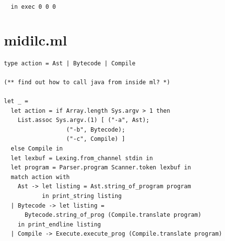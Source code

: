 \documentclass[12pt,A4]{book}
\begin{document}
\begin{verbatim}
  in exec 0 0 0
\end{verbatim}
\section{midilc.ml}
\begin{verbatim}
type action = Ast | Bytecode | Compile

(** find out how to call java from inside ml? *)

let _ =
  let action = if Array.length Sys.argv > 1 then
    List.assoc Sys.argv.(1) [ ("-a", Ast);
			      ("-b", Bytecode);
			      ("-c", Compile) ]
  else Compile in
  let lexbuf = Lexing.from_channel stdin in
  let program = Parser.program Scanner.token lexbuf in
  match action with
    Ast -> let listing = Ast.string_of_program program
           in print_string listing
  | Bytecode -> let listing =
      Bytecode.string_of_prog (Compile.translate program)
    in print_endline listing
  | Compile -> Execute.execute_prog (Compile.translate program)
 
\end{verbatim}
\end{document}
